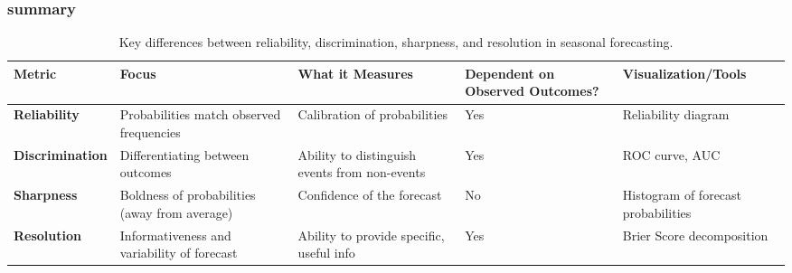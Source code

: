 \subsubsection{summary}
\begin{table}[h!]
\centering
\begin{tabularx}{\textwidth}{@{}p{2.5cm}p{4cm}p{4cm}p{2.5cm}p{3cm}@{}}
\toprule
\textbf{Metric}       & \textbf{Focus}                                    & \textbf{What it Measures}                         & \textbf{Dependent on Observed Outcomes?} & \textbf{Visualization/Tools}             \\ \midrule
\textbf{Reliability}   & Probabilities match observed frequencies          & Calibration of probabilities                      & Yes                                      & Reliability diagram                      \\
\textbf{Discrimination} & Differentiating between outcomes                 & Ability to distinguish events from non-events    & Yes                                      & ROC curve, AUC                           \\
\textbf{Sharpness}     & Boldness of probabilities (away from average)     & Confidence of the forecast                        & No                                       & Histogram of forecast probabilities      \\
\textbf{Resolution}    & Informativeness and variability of forecast       & Ability to provide specific, useful info         & Yes                                      & Brier Score decomposition                \\ \bottomrule
\end{tabularx}
\caption{Key differences between reliability, discrimination, sharpness, and resolution in seasonal forecasting.}
\end{table}

\newpage
\thispagestyle{empty}
\mbox{}

\endinput